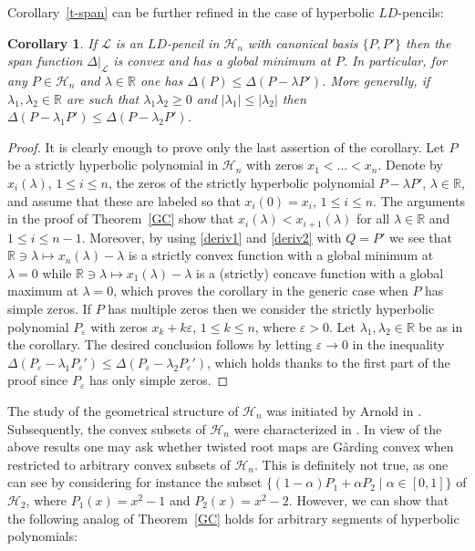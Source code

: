 \documentclass[10pt,twoside,a4paper,reqno]{amsart}
\theoremstyle{plain}
\newtheorem{coro+}           {Corollary}
\theoremstyle{definition}
\theoremstyle{remark}
\newenvironment{corollary}{\begin{coro+}}{\end{coro+}}
\newcommand {\bR} {\mathbb {R}}
\newcommand {\al} {\alpha}
\newcommand {\la} {\lambda}
\newcommand {\De} {\Delta}
\newcommand {\ve} {\varepsilon}
\newcommand {\calL} {\mathcal {L}}
\newcommand {\calH} {\mathcal {H}}
\begin{document}
Corollary~\ref{t-span} can be further refined in the case of hyperbolic 
$LD$-pencils:

\begin{corollary}\label{LD-span}
If $\calL$ is an $LD$-pencil in $\calH_n$ with canonical basis $\{P,P'\}$ 
then the span function $\De|_{\calL}$ is convex and has a global minimum at 
$P$. In particular, for any $P\in \calH_n$ and $\la\in \bR$ one has 
$\De(P)\le \De(P-\la P')$. More generally, if $\la_1, \la_2\in \bR$ are such 
that $\la_1 \la_2\ge 0$ and $|\la_1|\le |\la_2|$ then 
$\De(P-\la_1 P')\le \De(P-\la_2 P')$. 
\end{corollary}

\begin{proof}
It is clearly enough to prove only the last assertion of the corollary. Let 
$P$ be 
a strictly hyperbolic polynomial in $\calH_n$ with zeros $x_1<\ldots<x_n$. 
Denote by $x_i(\la)$, $1\le i\le n$, the zeros of the strictly hyperbolic 
polynomial $P-\la P'$, $\la\in \bR$, and assume that these are labeled so that 
$x_i(0)=x_i$, $1\le i\le n$. The arguments in the proof of Theorem~\ref{GC} 
show that $x_i(\la)<x_{i+1}(\la)$ for all $\la\in \bR$ and $1\le i\le n-1$. 
Moreover, by using \eqref{deriv1} and \eqref{deriv2} with $Q=P'$ we see that 
$\bR\ni \la\mapsto x_n(\la)-\la$ is a strictly convex function with a global 
minimum at $\la=0$ while $\bR\ni \la\mapsto x_1(\la)-\la$ is a (strictly) 
concave function with a global maximum at $\la=0$, which proves the corollary 
in the generic case when $P$ has simple zeros. If $P$ has multiple zeros then 
we consider the strictly hyperbolic polynomial $P_{\ve}$ with zeros 
$x_k+k\ve$, $1\le k\le n$, where $\ve>0$. Let $\la_1, \la_2\in \bR$ be as 
in the corollary. The desired conclusion follows by letting 
$\ve\rightarrow 0$ in the inequality 
$\De(P_{\ve}-\la_1 P_{\ve}')\le \De(P_{\ve}-\la_2 P_{\ve}')$, which holds 
thanks to the first part of the proof since $P_{\ve}$ has only simple zeros.
\end{proof}

The study of the geometrical structure of $\calH_n$ was initiated by 
Arnold in \cite{A}. Subsequently, the convex subsets of $\calH_n$ were 
characterized in \cite{D}. In view of the above results one may ask whether 
twisted root maps are G\aa rding convex when restricted to arbitrary convex 
subsets of $\calH_n$. This is definitely not true, as one can see by 
considering for instance the subset
$\{(1-\al)P_1+\al P_2\mid \al\in [0,1]\}$ of $\calH_2$, where 
$P_1(x)=x^2-1$ and $P_2(x)=x^2-2$. However, we can show that the following 
analog of Theorem~\ref{GC} holds for arbitrary segments of hyperbolic 
polynomials:
\end{document}

